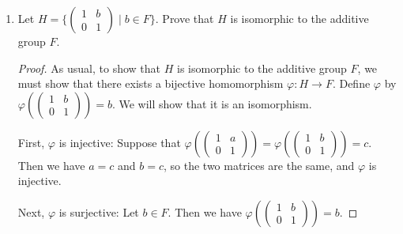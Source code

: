 \documentclass{article}
\begin{document}
\begin{enumerate}[label=(\alph*), itemsep=0em]
\begin{proof}
            The kernel of $\psi$ is the preimage of $(1, 1)$, that is, $\{ \begin{pmatrix}1 & b \\ 0 & 1\end{pmatrix} \mid b \in F \}$, and the fiber of $\psi$ over a given element $(a, c) \in F^\times \times F^\times$ is $\{ \begin{pmatrix}a & b \\ 0 & c\end{pmatrix} \mid b \in F \}$.
          \end{proof}
    \item Let $H = \{ \begin{pmatrix}1 & b \\ 0 & 1\end{pmatrix} \mid b \in F \}$. Prove that $H$ is isomorphic to the additive group $F$.
          \begin{proof}
            As usual, to show that $H$ is isomorphic to the additive group $F$, we must show that there exists a bijective homomorphism $\varphi: H \rightarrow F$. Define $\varphi$ by $\varphi(\begin{pmatrix}1 & b \\ 0 & 1\end{pmatrix}) = b$. We will show that it is an isomorphism.

            First, $\varphi$ is injective: Suppose that $\varphi(\begin{pmatrix}1 & a \\ 0 & 1\end{pmatrix}) = \varphi(\begin{pmatrix}1 & b \\ 0 & 1\end{pmatrix}) = c$. Then we have $a = c$ and $b = c$, so the two matrices are the same, and $\varphi$ is injective.

            Next, $\varphi$ is surjective: Let $b \in F$. Then we have $\varphi(\begin{pmatrix}1 & b \\ 0 & 1\end{pmatrix}) = b$.


\end{proof}
\end{enumerate}
\end{document}
